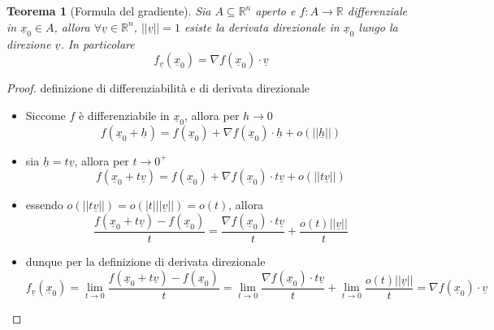 \documentclass[12pt, a4paper]{article}
\theoremstyle{break}
\newtheorem{theorem}{Teorema} %
\begin{document}
\newpage
\begin{theorem} [Formula del gradiente]
	Sia $A \subseteq \mathbb{R}^n$ aperto e $f: A \to \mathbb{R}$
	differenziale in $\underline{x}_0 \in A$, allora $\forall \underline{v} \in
		\mathbb{R}^n$, $||\underline{v}|| = 1$ esiste la derivata direzionale in
	$\underline{x}_0$ lungo la direzione $\underline{v}$. In particolare
	\[
		f_{\underline{v}}(\underline{x}_0) = \nabla f(\underline{x}_0) \cdot
		\underline{v}
	\]
\end{theorem}
\begin{proof} definizione di differenziabilità e di derivata direzionale
	\begin{itemize}
		\item Siccome $f$ è differenziabile in $\underline{x}_0$, allora per $h
			      \to 0$
		      \[
			      f(\underline{x}_0 + \underline{h}) = f(\underline{x}_0) + \nabla f
			      (\underline{x}_0) \cdot \underline{h}
			      + o(||\underline{h}||)
		      \]
		\item sia $\underline{h} = t \underline{v}$, allora per $t \to 0^+$
		      \[
			      f(\underline{x}_0 + t \underline{v}) = f(\underline{x}_0) +
			      \nabla f (\underline{x}_0) \cdot t \underline{v}
			      + o(||t \underline{v}||)
		      \]
		\item essendo $o(||t \underline{v}||) = o(|t| || \underline{v}||) =
			      o(t)$, allora
		      \[
			      \frac{f(\underline{x}_0 + t \underline{v}) -
				      f(\underline{x}_0)}{t} = \frac{\nabla f (\underline{x}_0) \cdot
				      t \underline{v}}{t} + \frac{o(t)||\underline{v}||}{t}
		      \]
		\item dunque per la definizione di derivata direzionale
		      \[
			      f_{\underline{v}}(\underline{x}_0)
			      = \lim_{t \to 0} \frac{f(\underline{x}_0 + t \underline{v}) -
				      f(\underline{x}_0)}{t}
			      = \lim_{t \to 0} \frac{\nabla f (\underline{x}_0) \cdot t
				      \underline{v}}{t} + \lim_{t \to 0}\frac{o(t) ||\underline{v}||}
			      {t} = \nabla f(\underline{x}_0) \cdot \underline{v}
		      \]
	\end{itemize}
\end{proof}
\end{document}
